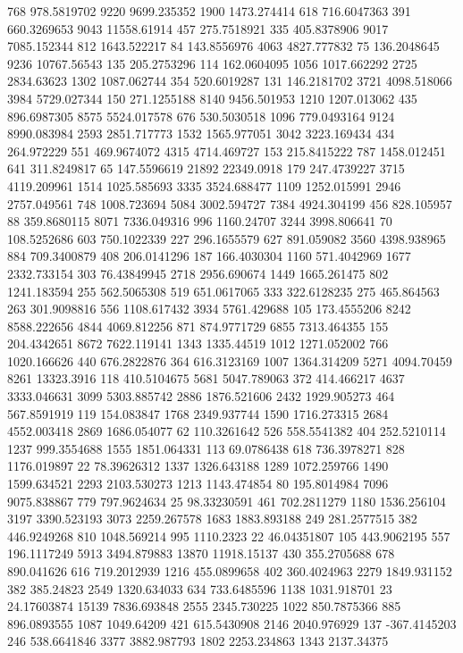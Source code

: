 768	978.5819702
9220	9699.235352
1900	1473.274414
618	716.6047363
391	660.3269653
9043	11558.61914
457	275.7518921
335	405.8378906
9017	7085.152344
812	1643.522217
84	143.8556976
4063	4827.777832
75	136.2048645
9236	10767.56543
135	205.2753296
114	162.0604095
1056	1017.662292
2725	2834.63623
1302	1087.062744
354	520.6019287
131	146.2181702
3721	4098.518066
3984	5729.027344
150	271.1255188
8140	9456.501953
1210	1207.013062
435	896.6987305
8575	5524.017578
676	530.5030518
1096	779.0493164
9124	8990.083984
2593	2851.717773
1532	1565.977051
3042	3223.169434
434	264.972229
551	469.9674072
4315	4714.469727
153	215.8415222
787	1458.012451
641	311.8249817
65	147.5596619
21892	22349.0918
179	247.4739227
3715	4119.209961
1514	1025.585693
3335	3524.688477
1109	1252.015991
2946	2757.049561
748	1008.723694
5084	3002.594727
7384	4924.304199
456	828.105957
88	359.8680115
8071	7336.049316
996	1160.24707
3244	3998.806641
70	108.5252686
603	750.1022339
227	296.1655579
627	891.059082
3560	4398.938965
884	709.3400879
408	206.0141296
187	166.4030304
1160	571.4042969
1677	2332.733154
303	76.43849945
2718	2956.690674
1449	1665.261475
802	1241.183594
255	562.5065308
519	651.0617065
333	322.6128235
275	465.864563
263	301.9098816
556	1108.617432
3934	5761.429688
105	173.4555206
8242	8588.222656
4844	4069.812256
871	874.9771729
6855	7313.464355
155	204.4342651
8672	7622.119141
1343	1335.44519
1012	1271.052002
766	1020.166626
440	676.2822876
364	616.3123169
1007	1364.314209
5271	4094.70459
8261	13323.3916
118	410.5104675
5681	5047.789063
372	414.466217
4637	3333.046631
3099	5303.885742
2886	1876.521606
2432	1929.905273
464	567.8591919
119	154.083847
1768	2349.937744
1590	1716.273315
2684	4552.003418
2869	1686.054077
62	110.3261642
526	558.5541382
404	252.5210114
1237	999.3554688
1555	1851.064331
113	69.0786438
618	736.3978271
828	1176.019897
22	78.39626312
1337	1326.643188
1289	1072.259766
1490	1599.634521
2293	2103.530273
1213	1143.474854
80	195.8014984
7096	9075.838867
779	797.9624634
25	98.33230591
461	702.2811279
1180	1536.256104
3197	3390.523193
3073	2259.267578
1683	1883.893188
249	281.2577515
382	446.9249268
810	1048.569214
995	1110.2323
22	46.04351807
105	443.9062195
557	196.1117249
5913	3494.879883
13870	11918.15137
430	355.2705688
678	890.041626
616	719.2012939
1216	455.0899658
402	360.4024963
2279	1849.931152
382	385.24823
2549	1320.634033
634	733.6485596
1138	1031.918701
23	24.17603874
15139	7836.693848
2555	2345.730225
1022	850.7875366
885	896.0893555
1087	1049.64209
421	615.5430908
2146	2040.976929
137	-367.4145203
246	538.6641846
3377	3882.987793
1802	2253.234863
1343	2137.34375
